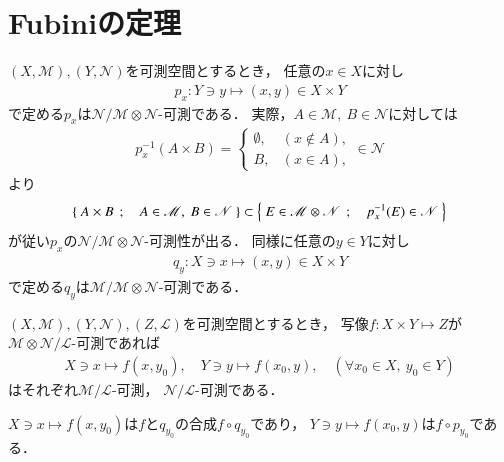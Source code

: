 \section{Fubiniの定理}
	$(X,\mathscr{M}),(Y,\mathscr{N})$を可測空間とするとき，
	任意の$x \in X$に対し
	\begin{align}
		p_x:Y \ni y \longmapsto (x,y) \in X \times Y
	\end{align}
	で定める$p_x$は$\mathscr{N}/\mathscr{M} \otimes \mathscr{N}$-可測である．
	実際，$A \in \mathscr{M},\ B \in \mathscr{N}$に対しては
	\begin{align}
		p_x^{-1}(A \times B) = 
		\begin{cases}
			\emptyset, & (x \notin A), \\
			B, & (x \in A),
		\end{cases}
		\in \mathscr{N}
	\end{align}
	より
	\begin{align}
		\left\{\ A \times B\ \, ; \quad A \in \mathscr{M},\ B \in \mathscr{N}\ \right\}
		\subset \left\{\ E \in \mathscr{M} \otimes \mathscr{N}\ \, ; \quad p_x^{-1}(E) \in \mathscr{N}\ \right\}
	\end{align}
	が従い$p_x$の$\mathscr{N}/\mathscr{M} \otimes \mathscr{N}$-可測性が出る．
	同様に任意の$y \in Y$に対し
	\begin{align}
		q_y:X \ni x \longmapsto (x,y) \in X \times Y
	\end{align}
	で定める$q_y$は$\mathscr{M}/\mathscr{M} \otimes \mathscr{N}$-可測である．
	
	\begin{screen}
		\begin{lem}[二変数可測写像は片変数で可測]
			$(X,\mathscr{M}),(Y,\mathscr{N}),(Z,\mathscr{L})$を可測空間とするとき，
			写像$f: X \times Y \longmapsto Z$が
			$\mathscr{M}\otimes \mathscr{N}/ \mathscr{L}$-可測であれば
			\begin{align}
				X \ni x \longmapsto f(x,y_0),
				\quad Y \ni y \longmapsto f(x_0,y),
				\quad (\forall x_0 \in X,\ y_0 \in Y)
			\end{align}
			はそれぞれ$\mathscr{M}/\mathscr{L}$-可測，
			$\mathscr{N}/\mathscr{L}$-可測である．
		\end{lem}
	\end{screen}
	
	\begin{prf}
		$X \ni x \longmapsto f(x,y_0)$は$f$と$q_{y_0}$の合成$f \circ q_{y_0}$であり，
		$Y \ni y \longmapsto f(x_0,y)$は$f \circ p_{y_0}$である．
		\QED
	\end{prf}
	
